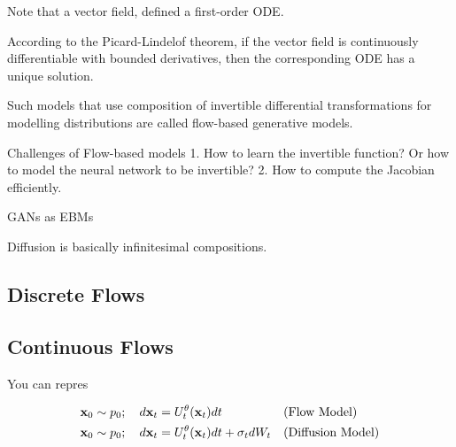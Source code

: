 \documentclass[a4paper, 11pt]{article}
\begin{document}
Note that a vector field, defined a first-order ODE.

According to the Picard-Lindelof theorem, if the vector field is continuously differentiable with bounded derivatives, then the corresponding ODE has a unique solution.



Such models that use composition of invertible differential transformations for modelling distributions are called flow-based generative models.

Challenges of Flow-based models 1. How to learn the invertible function? Or how to model the neural network to be invertible? 2. How to compute the Jacobian efficiently.


GANs as EBMs

\begin{center} 
\end{center} 


Diffusion is basically infinitesimal compositions.

\subsection{Discrete Flows}

\subsection{Continuous Flows}

You can repres

\begin{align}
    \mbox{$\mbox{$\mathbf{x}$}$}_0 \sim p_0; \quad d\mbox{$\mbox{$\mathbf{x}$}$}_t &= U_t^{\theta}(\mbox{$\mbox{$\mathbf{x}$}$}_t) dt && \text{(Flow Model)} \\
    \mbox{$\mbox{$\mathbf{x}$}$}_0 \sim p_0; \quad d\mbox{$\mbox{$\mathbf{x}$}$}_t &= U_t^{\theta}(\mbox{$\mbox{$\mathbf{x}$}$}_t) dt + \sigma_t dW_t && \text{(Diffusion Model)}
\end{align}
\end{document}
